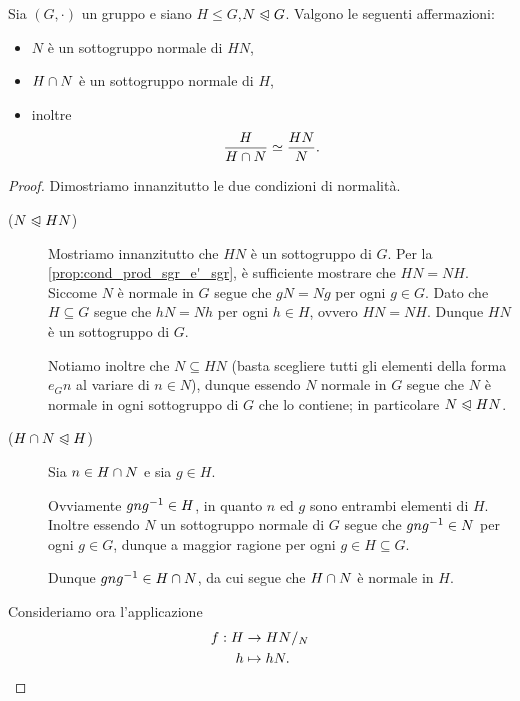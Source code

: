 \begin{theorem}
     Sia $(G, \cdot)$ un gruppo e siano $H \leq G$,$N \trianglelefteqslant G$. 
    Valgono le seguenti affermazioni: \begin{itemize}
        \item $N$ è un sottogruppo normale di $HN$,
        \item $H \cap N$ è un sottogruppo normale di $H$,
        \item inoltre \begin{equation}
            \frac{H}{H \cap N} \simeq \frac{HN}{N}.
        \end{equation}
    \end{itemize}
\end{theorem}
\begin{proof}
    Dimostriamo innanzitutto le due condizioni di normalità.
    \begin{description}
        \item[($N \trianglelefteqslant HN$)] Mostriamo innanzitutto che $HN$ è un sottogruppo di $G$. Per la \autoref{prop:cond_prod_sgr_e'_sgr}, è sufficiente mostrare che $HN = NH$. 
        Siccome $N$ è normale in $G$ segue che $gN = Ng$ per ogni $g \in G$. Dato che $H \subseteq G$ segue che $hN = Nh$ per ogni $h \in H$, ovvero $HN = NH$.
        Dunque $HN$ è un sottogruppo di $G$.

        Notiamo inoltre che $N \subseteq HN$ (basta scegliere tutti gli elementi della forma $e_Gn$ al variare di $n \in N$), dunque essendo $N$ normale in $G$ segue che $N$ è normale in ogni sottogruppo di $G$ che lo contiene; in particolare $N \trianglelefteqslant HN$.
        \item[($H \cap N \trianglelefteqslant H$)] Sia $n \in H \cap N$ e sia $g \in H$.
        
        Ovviamente $gng^{-1} \in H$, in quanto $n$ ed $g$ sono entrambi elementi di $H$. Inoltre essendo $N$ un sottogruppo normale di $G$ segue che $gng^{-1} \in N$ per ogni $g \in G$, dunque a maggior ragione per ogni $g \in H \subseteq G$. 
        
        Dunque $gng^{-1} \in H \cap N$, da cui segue che $H \cap N$ è normale in $H$.
    \end{description}
    Consideriamo ora l'applicazione 
    \begin{align*}
        \begin{split}
            f : H &\to {HN}/_{N} \\
            h &\mapsto hN.
        \end{split}
    \end{align*}  


\end{proof}
